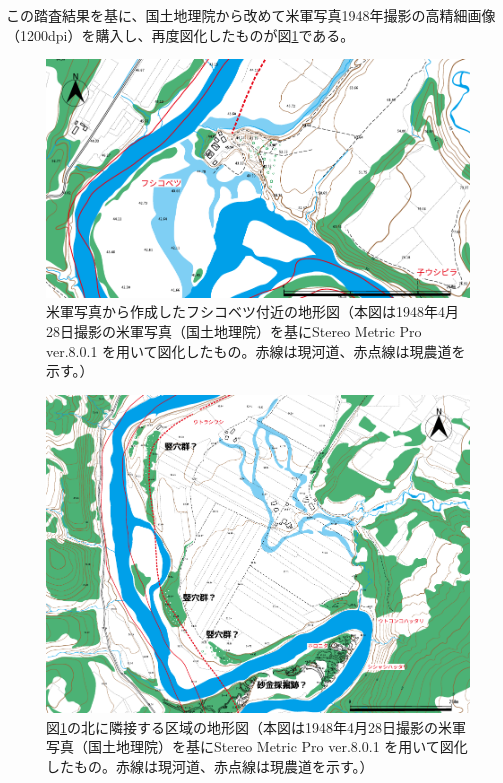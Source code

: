 \documentclass[a4j,11pt,twocolumn,openany]{jsbook}
\begin{document}
この踏査結果を基に、国土地理院から改めて米軍写真1948年撮影の高精細画像（1200dpi）を購入し、再度図化したものが図\ref{miya01fig}である。

\begin{figure}[ht]
	\centering
	\includegraphics[width=0.9\linewidth]{fig/05_Miyamoto/fig01.pdf}
	\caption{米軍写真から作成したフシコベツ付近の地形図（本図は1948年4月28日撮影の米軍写真（国土地理院）を基にStereo Metric Pro ver.8.0.1 を用いて図化したもの。赤線は現河道、赤点線は現農道を示す。）}
	\label{miya01fig}
\end{figure}

\begin{figure}[ht]
	\vspace{-0.5\baselineskip}
	\centering
	\includegraphics[width=0.9\linewidth]{fig/05_Miyamoto/fig02.pdf}
	\caption{図\ref{miya01fig}の北に隣接する区域の地形図（本図は1948年4月28日撮影の米軍写真（国土地理院）を基にStereo Metric Pro ver.8.0.1 を用いて図化したもの。赤線は現河道、赤点線は現農道を示す。）}
	\label{miya02fig}
\end{figure}
\end{document}
